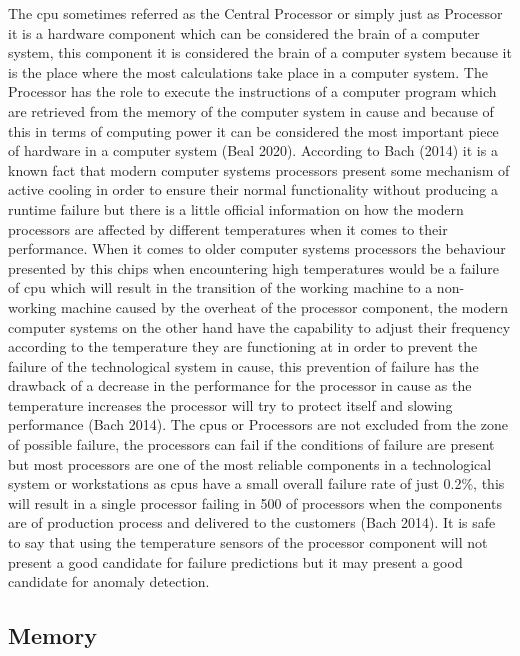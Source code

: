The \acrfull{cpu} sometimes referred as the Central Processor or simply just as Processor it is
a hardware component which can be considered the brain of a computer system, this component it is considered
the brain of a computer system because it is the place where the most calculations take place in a computer system.
The Processor has the role to execute the instructions of a computer program which are retrieved from the memory
of the computer system in cause and because of this in terms of computing power it can be considered the most
important piece of hardware in a computer system (Beal 2020). According to Bach (2014) it is a known fact that
modern computer systems processors present some mechanism of active cooling in order to ensure their normal
functionality without producing a runtime failure but there is a little official information on how the modern
processors are affected by different temperatures when it comes to their performance. When it comes to older
computer systems processors the behaviour presented by this chips when encountering high temperatures would be
a failure of \acrfull{cpu} which will result in the transition of the working machine to a
non-working machine caused by the overheat of the processor component, the modern computer systems on the other
hand have the capability to adjust their frequency according to the temperature they are functioning at in order
to prevent the failure of the technological system in cause, this prevention of failure has the drawback of a
decrease in the performance for the processor in cause as the temperature increases the processor will try to
protect itself and slowing performance (Bach 2014). The \acrfull{cpus} or Processors are not excluded
from the zone of possible failure, the processors can fail if the conditions of failure are present but most
processors are one of the most reliable components in a technological system or workstations as \acrfull{cpus}
have a small overall failure rate of just 0.2\%, this will result in a single processor failing in
500 of processors when the components are of production process and delivered to the customers (Bach 2014).
It is safe to say that using the temperature sensors of the processor component will not present a good candidate
for failure predictions but it may present a good candidate for anomaly detection.

\newpage

\subsection{Memory}

